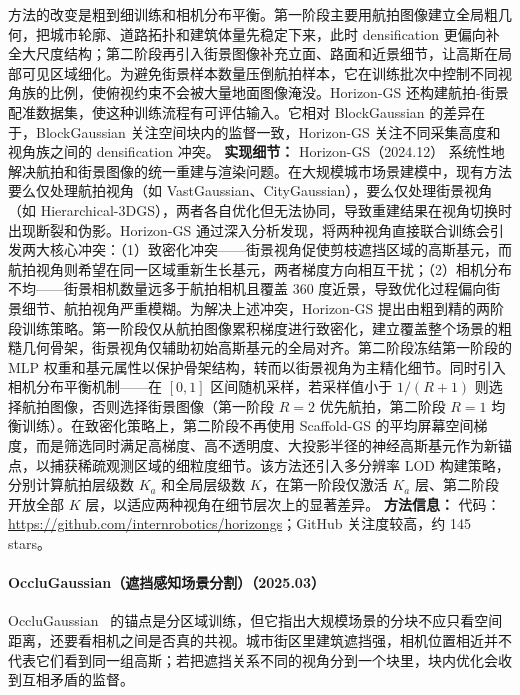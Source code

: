 方法的改变是粗到细训练和相机分布平衡。第一阶段主要用航拍图像建立全局粗几何，把城市轮廓、道路拓扑和建筑体量先稳定下来，此时 densification 更偏向补全大尺度结构；第二阶段再引入街景图像补充立面、路面和近景细节，让高斯在局部可见区域细化。为避免街景样本数量压倒航拍样本，它在训练批次中控制不同视角族的比例，使俯视约束不会被大量地面图像淹没。Horizon-GS 还构建航拍-街景配准数据集，使这种训练流程有可评估输入。它相对 BlockGaussian 的差异在于，BlockGaussian 关注空间块内的监督一致，Horizon-GS 关注不同采集高度和视角族之间的 densification 冲突。
\textbf{实现细节：} Horizon-GS（2024.12） 系统性地解决航拍和街景图像的统一重建与渲染问题。在大规模城市场景建模中，现有方法要么仅处理航拍视角（如 VastGaussian、CityGaussian），要么仅处理街景视角（如 Hierarchical-3DGS），两者各自优化但无法协同，导致重建结果在视角切换时出现断裂和伪影。Horizon-GS 通过深入分析发现，将两种视角直接联合训练会引发两大核心冲突：（1）致密化冲突——街景视角促使剪枝遮挡区域的高斯基元，而航拍视角则希望在同一区域重新生长基元，两者梯度方向相互干扰；（2）相机分布不均——街景相机数量远多于航拍相机且覆盖 360 度近景，导致优化过程偏向街景细节、航拍视角严重模糊。为解决上述冲突，Horizon-GS 提出由粗到精的两阶段训练策略。第一阶段仅从航拍图像累积梯度进行致密化，建立覆盖整个场景的粗糙几何骨架，街景视角仅辅助初始高斯基元的全局对齐。第二阶段冻结第一阶段的 MLP 权重和基元属性以保护骨架结构，转而以街景视角为主精化细节。同时引入相机分布平衡机制——在 $[0,1]$ 区间随机采样，若采样值小于 $1/(R+1)$ 则选择航拍图像，否则选择街景图像（第一阶段 $R\!=\!2$ 优先航拍，第二阶段 $R\!=\!1$ 均衡训练）。在致密化策略上，第二阶段不再使用 Scaffold-GS 的平均屏幕空间梯度，而是筛选同时满足高梯度、高不透明度、大投影半径的神经高斯基元作为新锚点，以捕获稀疏观测区域的细粒度细节。该方法还引入多分辨率 LOD 构建策略，分别计算航拍层级数 $K_a$ 和全局层级数 $K$，在第一阶段仅激活 $K_a$ 层、第二阶段开放全部 $K$ 层，以适应两种视角在细节层次上的显著差异。
\textbf{方法信息：} 代码：\url{https://github.com/internrobotics/horizongs}；GitHub 关注度较高，约 145 stars。



\paragraph{OccluGaussian（遮挡感知场景分割）（2025.03）}
OccluGaussian~\cite{2503_16177} 的锚点是分区域训练，但它指出大规模场景的分块不应只看空间距离，还要看相机之间是否真的共视。城市街区里建筑遮挡强，相机位置相近并不代表它们看到同一组高斯；若把遮挡关系不同的视角分到一个块里，块内优化会收到互相矛盾的监督。

